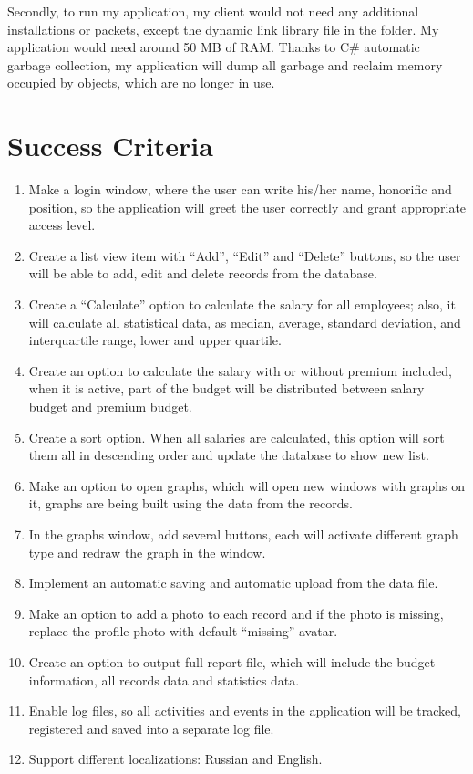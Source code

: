 \documentclass[a4]{article}
\begin{document}
Secondly, to run my application, my client would not need any additional installations or packets, except the dynamic link library file in the folder. My application would need around 50 MB of RAM. Thanks to C\# automatic garbage collection, my application will dump all garbage and reclaim memory occupied by objects, which are no longer in use.\\

\section{Success Criteria}

\begin{enumerate}
    \item Make a login window, where the user can write his/her name, honorific and position, so the application will greet the user correctly and grant appropriate access level.
    \item Create a list view item with “Add”, “Edit” and “Delete” buttons, so the user will be able to add, edit and delete records from the database.
    \item Create a “Calculate” option to calculate the salary for all employees; also, it will calculate all statistical data, as median, average, standard deviation, and interquartile range, lower and upper quartile.
    \item Create an option to calculate the salary with or without premium included, when it is active, part of the budget will be distributed between salary budget and premium budget.
    \item Create a sort option. When all salaries are calculated, this option will sort them all in descending order and update the database to show new list.
    \item	Make an option to open graphs, which will open new windows with graphs on it, graphs are being built using the data from the records.
    \item	In the graphs window, add several buttons, each will activate different graph type and redraw the graph in the window.
    \item	Implement an automatic saving and automatic upload from the data file.
    \item	Make an option to add a photo to each record and if the photo is missing, replace the profile photo with default “missing” avatar.
    \item	Create an option to output full report file, which will include the budget information, all records data and statistics data.
    \item   Enable log files, so all activities and events in the application will be tracked, registered and saved into a separate log file.
    \item	Support different localizations: Russian and English.
\end{enumerate}
\end{document}
